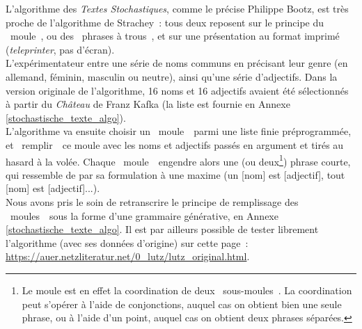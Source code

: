 \documentclass{article}
\begin{document}
				L'algorithme des \textit{Textes Stochastiques}, comme le précise Philippe Bootz, est très proche de l'algorithme de Strachey : tous deux reposent sur le principe du \guillemotleft~moule~\guillemotright, ou des \guillemotleft~phrases à trous~\guillemotright, et sur une présentation au format imprimé (\textit{teleprinter}, pas d'écran).\\ L'expérimentateur entre une série de noms communs en précisant leur genre (en allemand, féminin, masculin ou neutre), ainsi qu'une série d'adjectifs. Dans la version originale de l'algorithme, 16 noms et 16 adjectifs avaient été sélectionnés à partir du \textit{Château} de Franz Kafka (la liste est fournie en Annexe \ref{stochastische_texte_algo}).\\
				L'algorithme va ensuite choisir un \guillemotleft~moule~\guillemotright~parmi une liste finie préprogrammée, et \guillemotleft~remplir~\guillemotright~ce moule avec les noms et adjectifs passés en argument et tirés au hasard à la volée. Chaque \guillemotleft~moule~\guillemotright~engendre alors une (ou deux\footnote{Le moule est en effet la coordination de deux \guillemotleft~sous-moules~\guillemotright. La coordination peut s'opérer à l'aide de conjonctions, auquel cas on obtient bien une seule phrase, ou à l'aide d'un point, auquel cas on obtient deux phrases séparées.}) phrase courte, qui ressemble de par sa formulation à une maxime (un [nom] est [adjectif], tout [nom] est [adjectif]...).\\
				Nous avons pris le soin de retranscrire le principe de remplissage des \guillemotleft~moules~\guillemotright~sous la forme d'une grammaire générative, en Annexe \ref{stochastische_texte_algo}. Il est par ailleurs possible de tester librement l'algorithme (avec ses données d'origine) sur cette page : \href{https://auer.netzliteratur.net/0_lutz/lutz_original.html}{https://auer.netzliteratur.net/0\_lutz/lutz\_original.html}.\\
				
\end{document}
